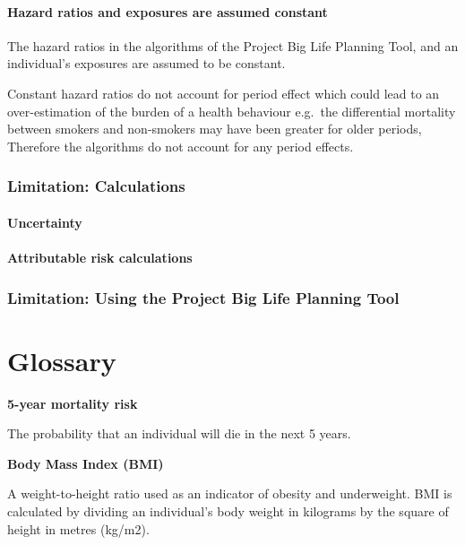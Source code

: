 \documentclass[]{book}
\begin{document}
\subsubsection{Hazard ratios and exposures are assumed
constant}\label{hazard-ratios-and-exposures-are-assumed-constant}

The hazard ratios in the algorithms of the Project Big Life Planning
Tool, and an individual's exposures are assumed to be constant.

Constant hazard ratios do not account for period effect which could lead
to an over-estimation of the burden of a health behaviour e.g.~the
differential mortality between smokers and non-smokers may have been
greater for older periods, Therefore the algorithms do not account for
any period effects.

\subsection{Limitation: Calculations}\label{limitation-calculations}

\subsubsection{Uncertainty}\label{uncertainty}

\subsubsection{Attributable risk
calculations}\label{attributable-risk-calculations}

\subsection{Limitation: Using the Project Big Life Planning
Tool}\label{limitation-using-the-project-big-life-planning-tool}

\hypertarget{glossary}{\chapter{Glossary}\label{glossary}}

\textbf{5-year mortality risk}

The probability that an individual will die in the next 5 years.

\textbf{Body Mass Index (BMI)}

A weight-to-height ratio used as an indicator of obesity and
underweight. BMI is calculated by dividing an individual's body weight
in kilograms by the square of height in metres (kg/m2).
\end{document}
